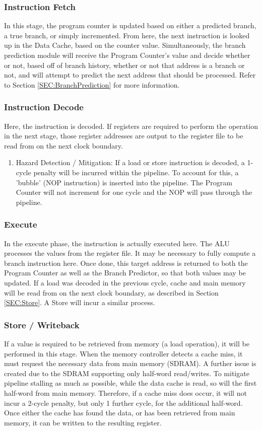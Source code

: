 \documentclass[11pt]{article}
\begin{document}
\subsubsection{Instruction Fetch}
\label{sec-3-1-1}
In this stage, the program counter is updated based on either a predicted branch, a true branch, or simply incremented. From here, the next instruction is looked up in the Data Cache, based on the counter value. Simultaneously, the branch prediction module will receive the Program Counter's value and decide whether or not, based off of branch history, whether or not that address is a branch or not, and will attempt to predict the next address that should be processed. Refer to Section \ref{SEC:BranchPrediction} for more information.
\subsubsection{Instruction Decode}
\label{sec-3-1-2}
Here, the instruction is decoded. If registers are required to perform the operation in the next stage, those register addresses are output to the register file to be read from on the next clock boundary.
\begin{enumerate}
\item Hazard Detection / Mitigation:
\label{sec-3-1-2-1}
If a load or store instruction is decoded, a 1-cycle penalty will be incurred within the pipeline. To account for this, a 'bubble' (NOP instruction) is inserted into the pipeline. The Program Counter will not increment for one cycle and the NOP will pass through the pipeline.
\end{enumerate}
\subsubsection{Execute}
\label{sec-3-1-3}
In the execute phase, the instruction is actually executed here. The ALU processes the values from the register file. It may be necessary to fully compute a branch instruction here. Once done, this target address is returned to both the Program Counter as well as the Branch Predictor, so that both values may be updated. 
If a load was decoded in the previous cycle, cache and main memory will be read from on the next clock boundary, as described in Section \ref{SEC:Store}.
A Store will incur a similar process.

\subsubsection{Store / Writeback}
\label{sec-3-1-4}
\label{SEC:Store}
    If a value is required to be retrieved from memory (a load operation), it will be performed in this stage. When the memory  controller detects a cache miss, it must request the necessary data from main memory (SDRAM). A further issue is created due to the SDRAM supporting only half-word read/writes. To mitigate pipeline stalling as much as possible, while the data cache is read, so will the first half-word from main memory. Therefore, if a cache miss does occur, it will not incur a 2-cycle penalty, but only 1 further cycle, for the additional half-word. Once either the cache has found the data, or has been retrieved from main memory, it can be written to the resulting register.
\end{document}

